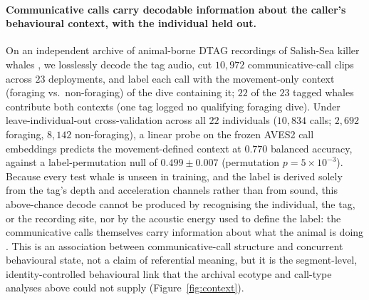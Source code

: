 \documentclass[11pt]{article}
\begin{document}
\paragraph{Communicative calls carry decodable information about the caller's behavioural
context, with the individual held out.} On an independent archive of animal-borne DTAG
recordings of Salish-Sea killer whales \citep{holt2024masking_data}, we losslessly decode the
tag audio, cut $10{,}972$ communicative-call clips across $23$ deployments, and label each
call with the movement-only context (foraging vs.\ non-foraging) of the dive containing it;
$22$ of the $23$ tagged whales contribute both contexts (one tag logged no qualifying
foraging dive). Under leave-individual-out cross-validation across all $22$ individuals
($10{,}834$ calls; $2{,}692$ foraging, $8{,}142$ non-foraging), a linear probe on the frozen
AVES2 call embeddings predicts the movement-defined context at $0.770$ balanced accuracy,
against a label-permutation null of $0.499 \pm 0.007$ (permutation $p=5\times10^{-3}$). Because
every test whale is unseen in training, and the label is derived solely from the tag's depth
and acceleration channels rather than from sound, this above-chance decode cannot be produced
by recognising the individual, the tag, or the recording site, nor by the acoustic energy used
to define the label: the communicative calls themselves carry information about what the animal
is doing \citep{tennessen2019,holt2024masking}. This is an association between communicative-call
structure and concurrent behavioural state, not a claim of referential meaning, but it is the
segment-level, identity-controlled behavioural link that the archival ecotype and call-type
analyses above could not supply (Figure~\ref{fig:context}).
\end{document}

